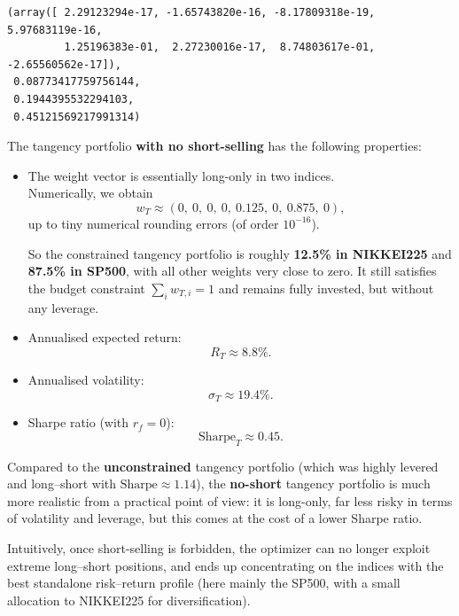 \documentclass[11pt]{article}
\begin{document}
            \begin{tcolorbox}[breakable, size=fbox, boxrule=.5pt, pad at break*=1mm, opacityfill=0]
\begin{Verbatim}[commandchars=\\\{\}]
(array([ 2.29123294e-17, -1.65743820e-16, -8.17809318e-19,  5.97683119e-16,
         1.25196383e-01,  2.27230016e-17,  8.74803617e-01, -2.65560562e-17]),
 0.08773417759756144,
 0.1944395532294103,
 0.45121569217991314)
\end{Verbatim}
\end{tcolorbox}
        
    The tangency portfolio \textbf{with no short-selling} has the following
properties:

\begin{itemize}
\item
  The weight vector is essentially long-only in two indices.\\
  Numerically, we obtain\\
  \[
  w_T \approx 
  (0,\ 0,\ 0,\ 0,\ 0.125,\ 0,\ 0.875,\ 0),
  \] up to tiny numerical rounding errors (of order \(10^{-16}\)).

  So the constrained tangency portfolio is roughly \textbf{12.5\% in
  NIKKEI225} and \textbf{87.5\% in SP500}, with all other weights very
  close to zero. It still satisfies the budget constraint
  \(\sum_i w_{T,i} = 1\) and remains fully invested, but without any
  leverage.
\item
  Annualised expected return:\\
  \[
  R_T \approx 8.8\%.
  \]
\item
  Annualised volatility:\\
  \[
  \sigma_T \approx 19.4\%.
  \]
\item
  Sharpe ratio (with \(r_f = 0\)):\\
  \[
  \text{Sharpe}_T \approx 0.45.
  \]
\end{itemize}

Compared to the \textbf{unconstrained} tangency portfolio (which was
highly levered and long--short with \(\text{Sharpe} \approx 1.14\)), the
\textbf{no-short} tangency portfolio is much more realistic from a
practical point of view: it is long-only, far less risky in terms of
volatility and leverage, but this comes at the cost of a lower Sharpe
ratio.

Intuitively, once short-selling is forbidden, the optimizer can no
longer exploit extreme long--short positions, and ends up concentrating
on the indices with the best standalone risk--return profile (here
mainly the SP500, with a small allocation to NIKKEI225 for
diversification).
\end{document}
